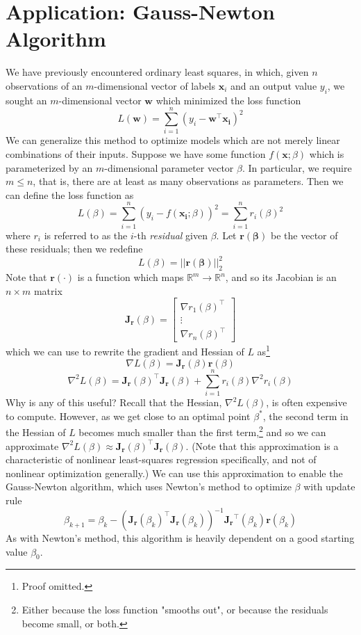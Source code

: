 \documentclass{article}
\begin{document}
\clearpage
\section*{Application: Gauss-Newton Algorithm}
We have previously encountered ordinary least squares, in which, given $n$ observations of an $m$-dimensional vector of labels $\mathbf{x}_i$ and an output value $y_i$, we sought an $m$-dimensional vector $\mathbf{w}$ which minimized the loss function $$L(\mathbf{w}) = \sum_{i=1}^n (y_i - \mathbf{w^\top x_i})^2$$
We can generalize this method to optimize models which are not merely linear combinations of their inputs. Suppose we have some function $f(\mathbf{x};\beta)$ which is parameterized by an $m$-dimensional parameter vector $\beta$. In particular, we require $m \leq n$, that is, there are at least as many observations as parameters. Then we can define the loss function as
$$L(\beta) = \sum_{i=1}^n(y_i - f(\mathbf{x_i}; \beta))^2 = \sum_{i=1}^n r_i(\beta)^2$$
where $r_i$ is referred to as the $i$-th \textit{residual} given $\beta$. Let $\mathbf{r(\beta)}$ be the vector of these residuals; then we redefine
$$L(\beta) = ||\mathbf{r(\beta)}||_2^2$$
Note that $\mathbf{r(\cdot)}$ is a function which maps $\mathbb{R}^m \rightarrow \mathbb{R}^n$, and so its Jacobian is an $n \times m$ matrix
$$\mathbf{J_r}(\beta) = \begin{bmatrix} \nabla r_1(\beta)^\top \\ \vdots \\ \nabla r_n(\beta)^\top \end{bmatrix}$$
which we can use to rewrite the gradient and Hessian of $L$ as\footnote{Proof omitted.}
$$\nabla L(\beta) = \mathbf{J_r}(\beta)\mathbf{r}(\beta)$$
$$\nabla^2 L(\beta) = \mathbf{J_r}(\beta)^\top\mathbf{J_r}(\beta) + \sum_{i=1}^n r_i(\beta)\nabla^2r_i(\beta)$$
Why is any of this useful? Recall that the Hessian, $\nabla^2 L(\beta)$, is often expensive to compute. However, as we get close to an optimal point $\beta^*$, the second term in the Hessian of $L$ becomes much smaller than the first term,\footnote{Either because the loss function "smooths out", or because the residuals become small, or both.} and so we can approximate $\nabla^2 L(\beta) \approx \mathbf{J_r}(\beta)^\top\mathbf{J_r}(\beta)$. (Note that this approximation is a characteristic of nonlinear least-squares regression specifically, and not of nonlinear optimization generally.) We can use this approximation to enable the Gauss-Newton algorithm, which uses Newton's method to optimize $\beta$ with update rule 
$$\beta_{k+1} = \beta_k - (\mathbf{J_r}(\beta_k)^\top\mathbf{J_r}(\beta_k))^{-1}\mathbf{J_r}^\top(\beta_k)\mathbf{r}(\beta_k)$$
As with Newton's method, this algorithm is heavily dependent on a good starting value $\beta_0$.
\end{document}
